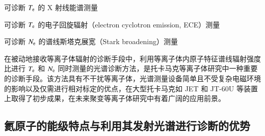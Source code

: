 \hspace{0.25em}\textbullet\hspace{0.45em}可诊断 $T_{\rm e}$ 的 X 射线能谱测量\cite{Xray-spectrum-Te-Ti}


\hspace{0.25em}\textbullet\hspace{0.45em}可诊断 $T_{\rm e}$ 的电子回旋辐射（electron cyclotron emission, ECE）测量\cite{ECE:physics}

\hspace{0.25em}\textbullet\hspace{0.45em}可诊断 $N_{\rm e}$ 的谱线斯塔克展宽（Stark broadening）测量\cite{Stark-broadening}


在被动地接收等离子体辐射的诊断手段中，利用等离子体内原子特征谱线辐射强度比进行 $T_{\rm e}$ 和 $N_{\rm e}$ 同时测量的光谱诊断方法，是托卡马克等离子体研究中一种重要的诊断手段。该方法具有不干扰等离子体，光谱测量设备简单且不受复杂电磁环境的影响以及仅需进行相对标定的优点\cite{boivin2001,xie:wlxb}，在大型托卡马克如 JET\cite{Davies1997-HeBES-JET} 和 JT-60U\cite{Hirotaka1999-HeCRM-JT60U} 等装置上取得了初步成果，在未来聚变等离子体研究中有着广阔的应用前景。



\subsection{氦原子的能级特点与利用其发射光谱进行诊断的优势}

